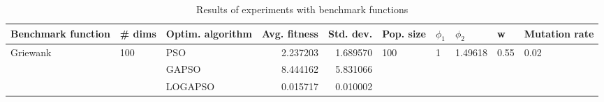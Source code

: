 \begin{table}
\centering
\caption{Results of experiments with benchmark functions}
\begin{tabular}{lllrrlllll}
\toprule
       Benchmark function &              \# dims & Optim. algorithm &  Avg. fitness &  Std. dev. &            Pop. size &         $\phi_{1}$ &               $\phi_{2}$ &                     w &         Mutation rate \\
\midrule
\multirow{3}{*}{Griewank} & \multirow{3}{*}{100} &              PSO &      2.237203 &   1.689570 & \multirow{3}{*}{100} & \multirow{3}{*}{1} & \multirow{3}{*}{1.49618} & \multirow{3}{*}{0.55} & \multirow{3}{*}{0.02} \\
                          &                      &            GAPSO &      8.444162 &   5.831066 &                      &                    &                          &                       &                       \\
                          &                      &          LOGAPSO &      0.015717 &   0.010002 &                      &                    &                          &                       &                       \\
\bottomrule
\end{tabular}
\end{table}
